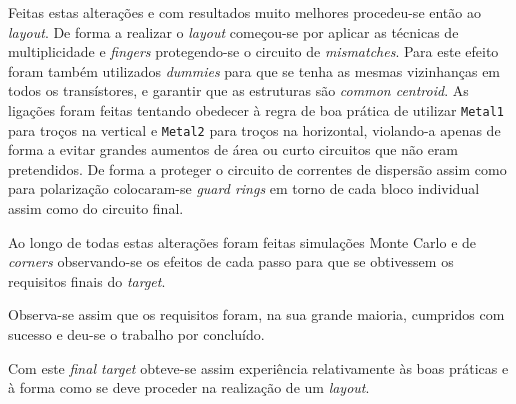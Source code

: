 \documentclass[11pt]{article}
\numberwithin{equation}{section}
\begin{document}
Feitas estas alterações e com resultados muito melhores procedeu-se então ao \textit{layout}. De forma a realizar o \textit{layout} começou-se por aplicar as técnicas de multiplicidade e \textit{fingers} protegendo-se o circuito de \textit{mismatches}. Para este efeito foram também utilizados \textit{dummies} para que se tenha as mesmas vizinhanças em todos os transístores, e garantir que as estruturas são \textit{common centroid}. As ligações foram feitas tentando obedecer à regra de boa prática de utilizar \texttt{Metal1} para troços na vertical e \texttt{Metal2} para troços na horizontal, violando-a apenas de forma a evitar grandes aumentos de área ou curto circuitos que não eram pretendidos. De forma a proteger o circuito de correntes de dispersão assim como para polarização colocaram-se \textit{guard rings} em torno de cada bloco individual assim como do circuito final.

Ao longo de todas estas alterações foram feitas simulações Monte Carlo e de \textit{corners} observando-se os efeitos de cada passo para que se obtivessem os requisitos finais do \textit{target}.


Observa-se assim que os requisitos foram, na sua grande maioria, cumpridos com sucesso e deu-se o trabalho por concluído.

Com este \textit{final target} obteve-se assim experiência relativamente às boas práticas e à forma como se deve proceder na realização de um \textit{layout}.
\end{document}
